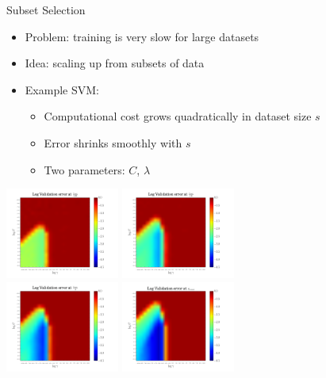 \begin{frame}[c,fragile]{Subset Selection }

\begin{itemize}
  \item Problem: training is very slow for large datasets
  \item Idea: scaling up from subsets of data
  \item Example SVM:
  \begin{itemize}
    \item Computational cost grows quadratically in dataset size $s$
    \item Error shrinks smoothly with $s$
    \item Two parameters: $C$, $\lambda$
  \end{itemize}
\end{itemize}

\centering
\includegraphics[width=0.28\textwidth]{images/subset_128}
\includegraphics[width=0.28\textwidth]{images/subset_16}\\
\includegraphics[width=0.28\textwidth]{images/subset_4}
\includegraphics[width=0.28\textwidth]{images/subset_full}


\end{frame}


